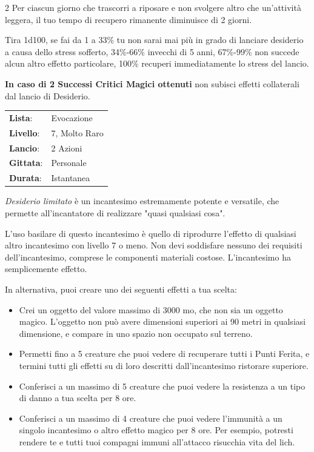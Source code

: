 \begin{multicols}{2}
Per ciascun giorno che trascorri a riposare e non svolgere altro che un'attività leggera, il tuo tempo di recupero rimanente diminuisce di 2 giorni.

Tira 1d100, se fai da 1 a 33\% tu non sarai mai più in grado di lanciare desiderio a causa dello stress sofferto, 34\%-66\% invecchi di 5 anni, 67\%-99\% non succede alcun altro effetto particolare, 100\% recuperi immediatamente lo stress del lancio.

\textbf{In caso di 2 Successi Critici Magici ottenuti} non subisci effetti collaterali dal lancio di Desiderio.


\noindent\begin{tabularx}{\linewidth}{p{1.9cm}X}
	\rowcolor{gray!20}\textbf{Lista}: & Evocazione \\
	\textbf{Livello}: & 7, Molto Raro \\
	\rowcolor{gray!20}\textbf{Lancio}: & 2 Azioni \\
	\textbf{Gittata}: & Personale \\
	\rowcolor{gray!20}\textbf{Durata}: & Istantanea \\
\end{tabularx}\smallskip

\emph{Desiderio limitato} è un incantesimo estremamente potente e versatile, che permette all'incantatore di realizzare "quasi qualsiasi cosa".

L'uso basilare di questo incantesimo è quello di riprodurre l'effetto di qualsiasi altro incantesimo con livello 7 o meno. Non devi soddisfare nessuno dei requisiti dell'incantesimo, comprese le componenti materiali costose. L'incantesimo ha semplicemente effetto.

In alternativa, puoi creare uno dei seguenti effetti a tua scelta:

\begin{itemize}[leftmargin=*] \setlength{\itemsep}{0pt}
	\item Crei un oggetto del valore massimo di 3000 mo, che non sia un oggetto magico. L'oggetto non può avere dimensioni superiori ai 90 metri in qualsiasi dimensione, e compare in uno spazio non occupato sul terreno.
	\item Permetti fino a 5 creature che puoi vedere di recuperare tutti i Punti Ferita, e termini tutti gli effetti su di loro descritti dall'incantesimo ristorare superiore.
	\item Conferisci a un massimo di 5 creature che puoi vedere la resistenza a un tipo di danno a tua scelta per 8 ore.
	\item Conferisci a un massimo di 4 creature che puoi vedere l'immunità a un singolo incantesimo o altro effetto magico per 8 ore. Per esempio, potresti rendere te e tutti tuoi compagni immuni all'attacco risucchia vita del lich.
\end{itemize}


\end{multicols}
